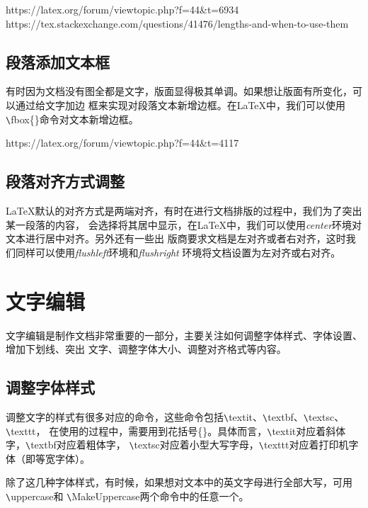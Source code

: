 {\begin{tcolorbox}[colback=red!5!white, colframe=red!50!black,
            title=设置段落间距的几种方法]
      https://latex.org/forum/viewtopic.php?f=44\&t=6934
      \tcblower
      https://tex.stackexchange.com/questions/41476/lengths-and-when-to-use-them
\end{tcolorbox}

\subsection{段落添加文本框}
有时因为文档没有图全都是文字，版面显得极其单调。如果想让版面有所变化，可以通过给文字加边
框来实现对段落文本新增边框。在LaTeX中，我们可以使用\verb|\|fbox\{\}命令对文本新增边框。

\begin{tcolorbox}[colback=red!5!white, colframe=red!50!black,
            title=How to put a box around multiple lines?]
      https://latex.org/forum/viewtopic.php?f=44\&t=4117
\end{tcolorbox}

\subsection{段落对齐方式调整}
LaTeX默认的对齐方式是两端对齐，有时在进行文档排版的过程中，我们为了突出某一段落的内容，
会选择将其居中显示，在LaTeX中，我们可以使用\emph{center}环境对文本进行居中对齐。另外还有一些出
版商要求文档是左对齐或者右对齐，这时我们同样可以使用\emph{flushleft}环境和\emph{flushright}
环境将文档设置为左对齐或右对齐。

\section{文字编辑}
文字编辑是制作文档非常重要的一部分，主要关注如何调整字体样式、字体设置、增加下划线、突出
文字、调整字体大小、调整对齐格式等内容。

\subsection{调整字体样式}
调整文字的样式有很多对应的命令，这些命令包括\verb|\|textit、\verb|\|textbf、\verb|\|textsc、\verb|\|texttt，
在使用的过程中，需要用到花括号\{\}。具体而言，\verb|\|textit对应着斜体字，\verb|\|textbf对应着粗体字，
\verb|\|textsc对应着小型大写字母，\verb|\|texttt对应着打印机字体（即等宽字体）。

除了这几种字体样式，有时候，如果想对文本中的英文字母进行全部大写，可用\verb|\|uppercase和
\verb|\|MakeUppercase两个命令中的任意一个。

}
